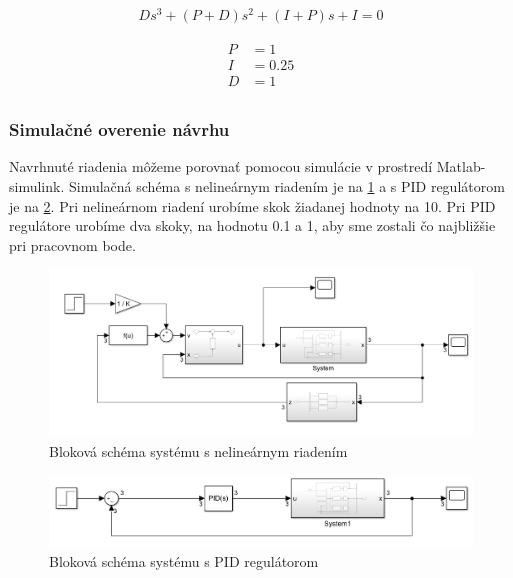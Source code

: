 \documentclass[../main.tex]{subfiles}
\begin{document}
\begin{equation}
		\begin{aligned}
		Ds^3+(P+D)s^2+(I+P)s+I=0
		\end{aligned}
		\label{eqn:svlvs2_nasaURO}
	\end{equation}

\begin{equation}
		\begin{aligned}
		P &= 1 						\\
		I &= 0.25 						\\
		D &= 1						 \\
		\end{aligned}
		\label{eqn:svlvs2_parametrePID}
	\end{equation}

\newpage
\subsubsection{Simulačné overenie návrhu}

Navrhnuté riadenia môžeme porovnať pomocou simulácie v prostredí Matlab-simulink. Simulačná schéma s nelineárnym riadením je na \cref{fig:svlvs2_modelRiadenia} a s PID regulátorom je na \cref{fig:svlvs2_modelRiadeniaPID}. Pri nelineárnom riadení urobíme skok žiadanej hodnoty na 10. Pri PID regulátore urobíme dva skoky, na hodnotu 0.1 a 1, aby sme zostali čo najbližšie pri pracovnom bode.
	\begin{figure}[h!]
		\centering
		\includegraphics[width=0.8\linewidth]{ModelRiadenia}
		\caption{Bloková schéma systému s nelineárnym riadením}
		\label{fig:svlvs2_modelRiadenia}
	\end{figure}

	\begin{figure}[h!]
		\centering
		\includegraphics[width=0.8\linewidth]{ModelRiadeniaPID}
		\caption{Bloková schéma systému s PID regulátorom}
		\label{fig:svlvs2_modelRiadeniaPID}
	\end{figure}
\end{document}
